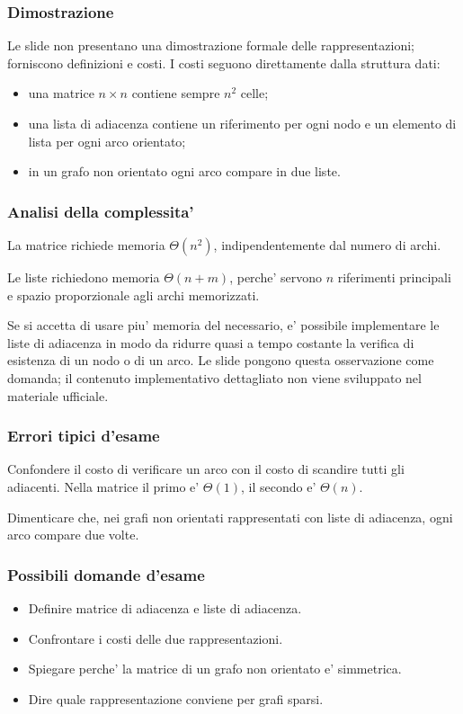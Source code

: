 \subsubsection{Dimostrazione}
Le slide non presentano una dimostrazione formale delle rappresentazioni; forniscono definizioni e costi. I costi seguono direttamente dalla struttura dati:
\begin{itemize}
	\item una matrice $n\times n$ contiene sempre $n^2$ celle;
	\item una lista di adiacenza contiene un riferimento per ogni nodo e un elemento di lista per ogni arco orientato;
	\item in un grafo non orientato ogni arco compare in due liste.
\end{itemize}

\subsubsection{Analisi della complessita'}
La matrice richiede memoria $\Theta(n^2)$, indipendentemente dal numero di archi.

Le liste richiedono memoria $\Theta(n+m)$, perche' servono $n$ riferimenti principali e spazio proporzionale agli archi memorizzati.

Se si accetta di usare piu' memoria del necessario, e' possibile implementare le liste di adiacenza in modo da ridurre quasi a tempo costante la verifica di esistenza di un nodo o di un arco. Le slide pongono questa osservazione come domanda; il contenuto implementativo dettagliato non viene sviluppato nel materiale ufficiale.

\subsubsection{Errori tipici d'esame}
\begin{hardnote}
Confondere il costo di verificare un arco con il costo di scandire tutti gli adiacenti. Nella matrice il primo e' $\Theta(1)$, il secondo e' $\Theta(n)$.
\end{hardnote}

\begin{hardnote}
Dimenticare che, nei grafi non orientati rappresentati con liste di adiacenza, ogni arco compare due volte.
\end{hardnote}

\subsubsection{Possibili domande d'esame}
\begin{itemize}
	\item Definire matrice di adiacenza e liste di adiacenza.
	\item Confrontare i costi delle due rappresentazioni.
	\item Spiegare perche' la matrice di un grafo non orientato e' simmetrica.
	\item Dire quale rappresentazione conviene per grafi sparsi.
\end{itemize}

